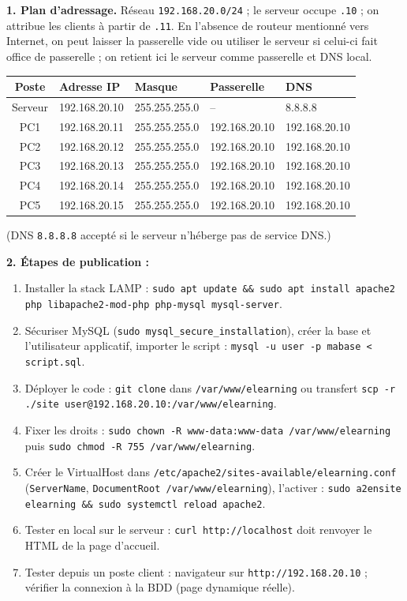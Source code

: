 \documentclass[11pt]{article}
\begin{document}
\begin{corrige}
\textbf{1. Plan d'adressage.} Réseau \texttt{192.168.20.0/24} ; le serveur occupe \texttt{.10} ; on attribue les clients à partir de \texttt{.11}. En l'absence de routeur mentionné vers Internet, on peut laisser la passerelle vide ou utiliser le serveur si celui-ci fait office de passerelle ; on retient ici le serveur comme passerelle et DNS local.
\begin{center}
\begin{tabularx}{\linewidth}{|c|X|X|X|X|}\hline
\rowcolor{popblueL} \textbf{Poste} & \textbf{Adresse IP} & \textbf{Masque} & \textbf{Passerelle} & \textbf{DNS} \\\hline
Serveur & 192.168.20.10 & 255.255.255.0 & -- & 8.8.8.8 \\\hline
PC1 & 192.168.20.11 & 255.255.255.0 & 192.168.20.10 & 192.168.20.10 \\\hline
PC2 & 192.168.20.12 & 255.255.255.0 & 192.168.20.10 & 192.168.20.10 \\\hline
PC3 & 192.168.20.13 & 255.255.255.0 & 192.168.20.10 & 192.168.20.10 \\\hline
PC4 & 192.168.20.14 & 255.255.255.0 & 192.168.20.10 & 192.168.20.10 \\\hline
PC5 & 192.168.20.15 & 255.255.255.0 & 192.168.20.10 & 192.168.20.10 \\\hline
\end{tabularx}
\end{center}
(DNS \texttt{8.8.8.8} accepté si le serveur n'héberge pas de service DNS.)

\textbf{2. Étapes de publication :}
\begin{enumerate}
    \item Installer la stack LAMP : \texttt{sudo apt update \&\& sudo apt install apache2 php libapache2-mod-php php-mysql mysql-server}.
    \item Sécuriser MySQL (\texttt{sudo mysql\_secure\_installation}), créer la base et l'utilisateur applicatif, importer le script : \texttt{mysql -u user -p mabase < script.sql}.
    \item Déployer le code : \texttt{git clone} dans \texttt{/var/www/elearning} ou transfert \texttt{scp -r ./site user@192.168.20.10:/var/www/elearning}.
    \item Fixer les droits : \texttt{sudo chown -R www-data:www-data /var/www/elearning} puis \texttt{sudo chmod -R 755 /var/www/elearning}.
    \item Créer le VirtualHost dans \texttt{/etc/apache2/sites-available/elearning.conf} (\texttt{ServerName}, \texttt{DocumentRoot /var/www/elearning}), l'activer : \texttt{sudo a2ensite elearning \&\& sudo systemctl reload apache2}.
    \item Tester en local sur le serveur : \texttt{curl http://localhost} doit renvoyer le HTML de la page d'accueil.
    \item Tester depuis un poste client : navigateur sur \texttt{http://192.168.20.10} ; vérifier la connexion à la BDD (page dynamique réelle).
\end{enumerate}


\end{corrige}
\end{document}

